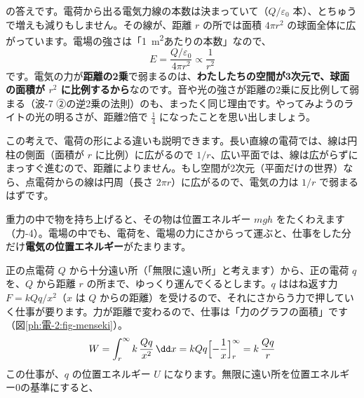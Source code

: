 \label{ph:電-2:hatena}\bkhatenaref の答えです。電荷から出る電気力線の本数は決まっていて（$Q/\varepsilon_0$ 本）、とちゅうで増えも減りもしません。その線が、距離 $r$ の所では面積 $4\pi r^2$ の球面全体に広がっています。電場の強さは「\qty{1}{m^2}あたりの本数」なので、
\[E=\frac{Q/\varepsilon_0}{4\pi r^2}\propto\frac{1}{r^2}\]
です。電気の力が\textbf{距離の2乗}で弱まるのは、\textbf{わたしたちの空間が3次元で、球面の面積が $r^2$ に比例するから}なのです。音や光の強さが距離の2乗に反比例して弱まる（波-7 ②の逆2乗の法則）のも、まったく同じ理由です。やってみようのライトの光の明るさが、距離2倍で $\tfrac14$ になったことを思い出しましょう。

この考えで、電荷の形による違いも説明できます。長い直線の電荷では、線は円柱の側面（面積が $r$ に比例）に広がるので $1/r$、広い平面では、線は広がらずにまっすぐ進むので、距離によりません。もし空間が2次元（平面だけの世界）なら、点電荷からの線は円周（長さ $2\pi r$）に広がるので、電気の力は $1/r$ で弱まるはずです。

\label{ph:電-2:sec5}
重力の中で物を持ち上げると、その物は位置エネルギー $mgh$ をたくわえます（力-4）。電場の中でも、電荷を、電場の力にさからって運ぶと、仕事をした分だけ\textbf{電気の位置エネルギー}がたまります。

正の点電荷 $Q$ から十分遠い所（「無限に遠い所」と考えます）から、正の電荷 $q$ を、$Q$ から距離 $r$ の所まで、ゆっくり運んでくるとします。$q$ ははね返す力 $F=kQq/x^2$（$x$ は $Q$ からの距離）を受けるので、それにさからう力で押していく仕事が要ります。力が距離で変わるので、仕事は「力のグラフの面積」です（図\ref{ph:電-2:fig-menseki}）。
\[W=\int_r^{\infty}k\,\frac{Qq}{x^2}\,\dd x=kQq\Bigl[-\frac1x\Bigr]_r^{\infty}=k\,\frac{Qq}{r}\]
この仕事が、$q$ の位置エネルギー $U$ になります。無限に遠い所を位置エネルギー0の基準にすると、

